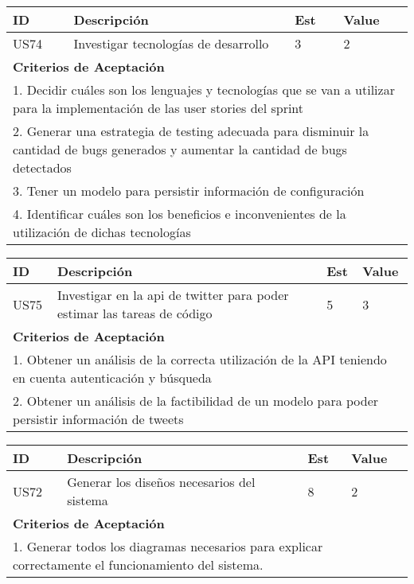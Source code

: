 \documentclass[a4paper,8pt]{article}
\begin{document}
\bigskip
\begin{tabular}{|p{1cm}|p{10cm}|p{1cm}|p{1cm}|}
\hline
\hline
\textbf{ID}&\textbf{Descripción}&\textbf{Est}&\textbf{Value}\\
\hline
\hline
US74&Investigar tecnologías de desarrollo&3&2\\
\hline
\hline
\multicolumn{4}{|p{13cm}|}{ \textbf{Criterios de Aceptación}} \\
\hline
\hline
\multicolumn{4}{|p{13cm}|}{1. Decidir cuáles son los lenguajes y tecnologías que se van a utilizar para la implementación de las user stories del sprint}\\
\multicolumn{4}{|p{13cm}|}{2. Generar una estrategia de testing adecuada para disminuir la cantidad de bugs generados y aumentar la cantidad de bugs detectados}\\
\multicolumn{4}{|p{13cm}|}{3. Tener un modelo para persistir información de configuración}\\
\multicolumn{4}{|p{13cm}|}{4. Identificar cuáles son los beneficios e inconvenientes de la utilización de dichas tecnologías}\\
\hline
\hline
\end{tabular}

\bigskip
\begin{tabular}{|p{1cm}|p{10cm}|p{1cm}|p{1cm}|}
\hline
\hline
\textbf{ID}&\textbf{Descripción}&\textbf{Est}&\textbf{Value}\\
\hline
\hline
US75&Investigar en la api de twitter para poder estimar las tareas de código&5&3\\
\hline
\hline
\multicolumn{4}{|p{13cm}|}{ \textbf{Criterios de Aceptación}} \\
\hline
\hline
\multicolumn{4}{|p{13cm}|}{1. Obtener un análisis de la correcta utilización de la API teniendo en cuenta autenticación y búsqueda}\\
\multicolumn{4}{|p{13cm}|}{2. Obtener un análisis de la factibilidad de un modelo para poder persistir información de tweets}\\
\hline
\hline
\end{tabular}


\bigskip
\begin{tabular}{|p{1cm}|p{10cm}|p{1cm}|p{1cm}|}
\hline
\hline
\textbf{ID}&\textbf{Descripción}&\textbf{Est}&\textbf{Value}\\
\hline
\hline
US72&Generar los diseños necesarios del sistema&8&2\\
\hline
\hline
\multicolumn{4}{|p{13cm}|}{ \textbf{Criterios de Aceptación}} \\
\hline
\hline
\multicolumn{4}{|p{13cm}|}{1. Generar todos los diagramas necesarios para explicar correctamente el funcionamiento del sistema.}\\
\hline
\hline
\end{tabular}
\end{document}
